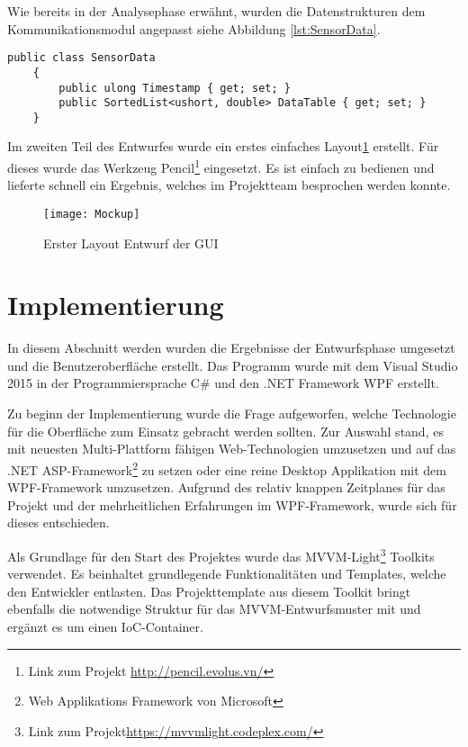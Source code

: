 Wie bereits in der Analysephase erwähnt, wurden die Datenstrukturen dem Kommunikationsmodul angepasst siehe Abbildung \ref{lst:SensorData}.\\
\begin{lstlisting}[frame=single, caption=Beschreibung der Sensordatenstruktur, label=lst:SensorData]
    public class SensorData
    {
        public ulong Timestamp { get; set; }
        public SortedList<ushort, double> DataTable { get; set; }
    }
\end{lstlisting}
Im zweiten Teil des Entwurfes wurde ein erstes einfaches Layout\ref{fig:gui} erstellt. Für dieses wurde das Werkzeug Pencil\footnote{Link zum Projekt \url{http://pencil.evolus.vn/}} eingesetzt. Es ist einfach zu bedienen und lieferte schnell ein Ergebnis, welches im Projektteam besprochen werden konnte.

\begin{figure}[h]
	\centering
		\texttt{[image: Mockup]}
		\caption{Erster Layout Entwurf der GUI}
		\label{fig:gui}
\end{figure}


\section{Implementierung}
In diesem Abschnitt werden wurden die Ergebnisse der Entwurfsphase umgesetzt und die Benutzeroberfläche erstellt. Das Programm wurde mit dem Visual Studio 2015 in der Programmiersprache C\# und den .NET Framework WPF erstellt.

Zu beginn der Implementierung wurde die Frage aufgeworfen, welche Technologie für die Oberfläche zum Einsatz gebracht werden sollten. Zur Auswahl stand, es mit neuesten Multi-Plattform fähigen Web-Technologien umzusetzen und auf das .NET ASP-Framework\footnote{Web Applikations Framework von Microsoft} zu setzen oder eine reine Desktop Applikation mit dem WPF-Framework umzusetzen. Aufgrund des relativ knappen Zeitplanes für das Projekt und der mehrheitlichen Erfahrungen im WPF-Framework, wurde sich für dieses entschieden.

Als Grundlage für den Start des Projektes wurde das MVVM-Light\footnote{Link zum Projekt\url{https://mvvmlight.codeplex.com/}} Toolkits verwendet. Es beinhaltet grundlegende Funktionalitäten und Templates, welche den Entwickler entlasten. Das Projekttemplate aus diesem Toolkit bringt ebenfalls die notwendige Struktur für das MVVM-Entwurfsmuster mit und ergänzt es um einen IoC-Container.

